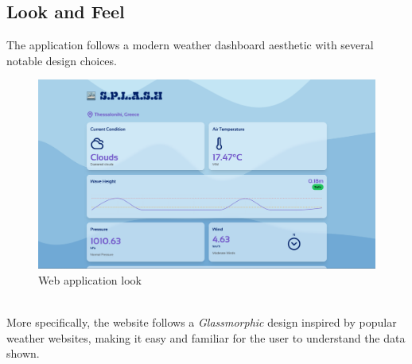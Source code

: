\documentclass{article}
\begin{document}
\subsection{Look and Feel}
    The application follows a modern weather dashboard aesthetic with several notable design choices.
    \begin{figure}[h]
        \centering
        \includegraphics[width=1\linewidth]{assets/FE_F2.png}
        \caption{Web application look}
        \label{fig:frontend}
    \end{figure}
    \\
    More specifically, the website follows a \textit{Glassmorphic} design inspired by popular weather websites, making it easy and familiar for the user to understand the data shown.
\end{document}

